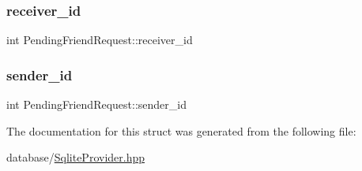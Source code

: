 \subsubsection{\texorpdfstring{receiver\+\_\+id}{receiver\_id}}
{\footnotesize\ttfamily int Pending\+Friend\+Request\+::receiver\+\_\+id}

\mbox{\label{structPendingFriendRequest_a97698308250bf5be4d12079f53aed946}} 
\subsubsection{\texorpdfstring{sender\+\_\+id}{sender\_id}}
{\footnotesize\ttfamily int Pending\+Friend\+Request\+::sender\+\_\+id}



The documentation for this struct was generated from the following file\+:\begin{DoxyCompactItemize}
\item 
database/\mbox{\hyperlink{SqliteProvider_8hpp}{Sqlite\+Provider.\+hpp}}\end{DoxyCompactItemize}
